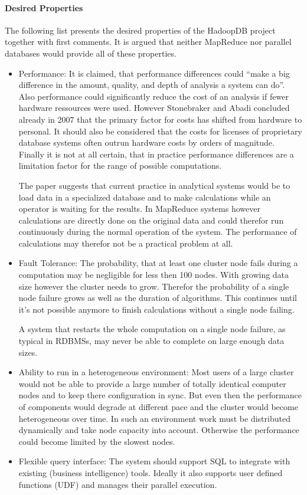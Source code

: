 \documentclass[12pt,a4paper]{scrartcl}		%
\begin{document}
\paragraph{Desired Properties}
The following list presents the desired properties of the HadoopDB project together with first comments. It is argued that neither MapReduce nor parallel databases would provide all of these properties.

\begin{itemize}
\item Performance: It is claimed, that performance differences could ``make a big difference in the amount, quality, and depth of analysis a system can do''. Also performance could significantly reduce the cost of an analysis if fewer hardware ressources were used. However Stonebraker and Abadi concluded already in 2007 that the primary factor for costs has shifted from hardware to personal.\cite[2.5 No Knobs]{sto07} It should also be considered that the costs for licenses of proprietary database systems often outrun hardware costs by orders of magnitude. Finally it is not at all certain, that in practice performance differences are a limitation factor for the range of possible computations.

The paper suggests that current practice in analytical systems would be to load data in a specialized database and to make calculations while an operator is waiting for the results. In MapReduce systems however calculations are directly done on the original data and could therefor run continuously during the normal operation of the system. The performance of calculations may therefor not be a practical problem at all.

\item Fault Tolerance:  The probability, that at least one cluster node fails during a computation may be negligible for less then 100 nodes. With growing data size however the cluster needs to grow. Therefor the probability of a single node failure grows as well as the duration of algorithms. This continues until it's not possible anymore to finish calculations without a single node failing.

A system that restarts the whole computation on a single node failure, as typical in RDBMSs, may never be able to complete on large enough data sizes.

\item Ability to run in a heterogeneous environment: Most users of a large cluster would not be able to provide a large number of totally identical computer nodes and to keep there configuration in sync. But even then the performance of components would degrade at different pace and the cluster would become heterogeneous over time. In such an environment work must be distributed dynamically and take node capacity into account. Otherwise the performance could become limited by the slowest nodes.

\item Flexible query interface: The system should support SQL to integrate with existing (business intelligence) tools. Ideally it also supports user defined functions (UDF) and manages their parallel execution.

\end{itemize}
\end{document}
